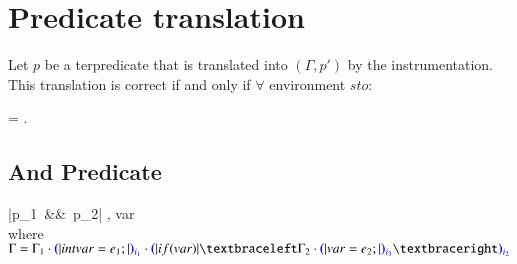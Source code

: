 \section{Predicate translation}
\label{sec:predicate-translation}


\begin{lemma}
  Let $p$ be a terpredicate that is translated into $(\Gamma, p')$ by the
  instrumentation. This translation is correct if and only if $\forall$
  environment $sto$:

   = .
\end{lemma}


\subsection{And Predicate}

{
  { \mathtt|p_1\ \&\&\ p_2| \mapsto \Gamma, var }
}~\\

where
\(
\Gamma = \Gamma_1
\cdot \openpar \mathtt|int var = e_1;| \closepar{i_1}
\cdot \openpar \mathtt|if(var)| \bopen
\Gamma_2
\cdot \openpar \mathtt|var = e_2;| \closepar{i_3}
\bclose \closepar{i_2}
\)

